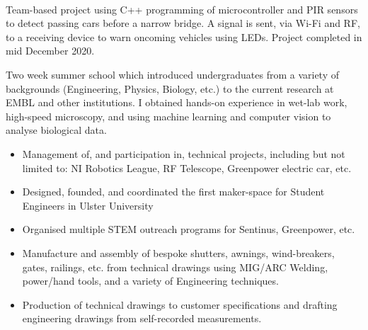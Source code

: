\documentclass[10pt,a4paper,withhyper]{altacv}
\begin{document}
\begin{paracol}{2}
\divider

\\
\vspace{1mm}
Team-based project using C++ programming of microcontroller and PIR sensors to detect passing cars before a narrow bridge. A signal is sent, via Wi-Fi and RF, to a receiving device to warn oncoming vehicles using LEDs. Project completed in mid December 2020.

\divider

\end{paracol}


Two week summer school which introduced undergraduates from a variety of backgrounds (Engineering, Physics, Biology, etc.) to the current research at EMBL and other institutions. I obtained hands-on experience in wet-lab work, high-speed microscopy, and using machine learning and computer vision to analyse biological data.

\divider


\begin{itemize}
\item Management of, and participation in, technical projects, including but not limited to: NI Robotics League, RF Telescope, Greenpower electric car, etc.
\item Designed, founded, and coordinated the first maker-space for Student Engineers in Ulster University
\item Organised multiple STEM outreach programs for Sentinus, Greenpower, etc.
\end{itemize}


\divider

\begin{itemize}
\item Manufacture and assembly of bespoke shutters, awnings, wind-breakers, gates, railings, etc. from technical drawings using MIG/ARC Welding, power/hand tools, and a variety of Engineering techniques.
\item Production of technical drawings to customer specifications and drafting \\engineering drawings from self-recorded measurements.
\end{itemize}
\end{document}
